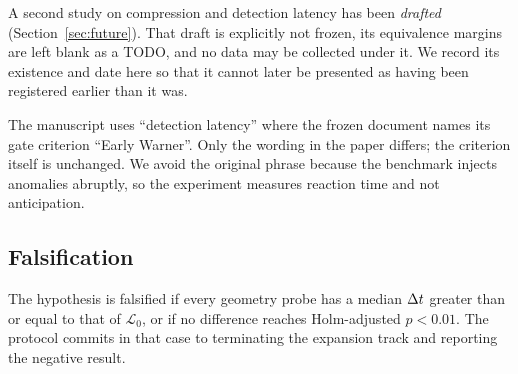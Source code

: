 A second study on compression and detection latency has been \emph{drafted}
(Section~\ref{sec:future}). That draft is explicitly not frozen, its equivalence
margins are left blank as a TODO, and no data may be collected under it. We
record its existence and date here so that it cannot later be presented as
having been registered earlier than it was.

The manuscript uses ``detection latency'' where the frozen document names its
gate criterion ``Early Warner''. Only the wording in the paper differs; the
criterion itself is unchanged. We avoid the original phrase because the
benchmark injects anomalies abruptly, so the experiment measures reaction time
and not anticipation.

\subsection{Falsification}

The hypothesis is falsified if every geometry probe has a median $\Delta t$ greater
than or equal to that of $\mathcal{L}_0$, or if no difference reaches
Holm-adjusted $p<0.01$. The protocol commits in that case to terminating the
expansion track and reporting the negative result.

